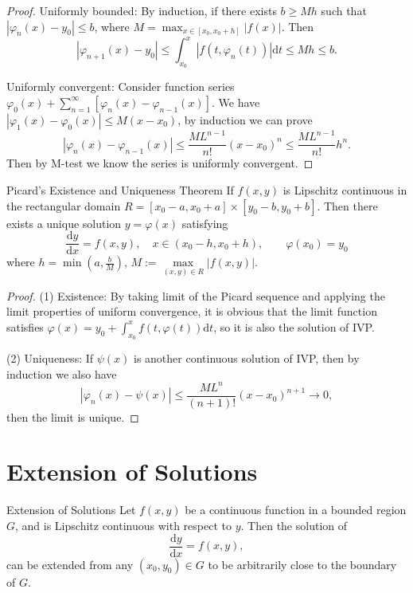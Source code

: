\begin{proof}
  Uniformly bounded: By induction, if there exists $b \geq Mh$ such that $|\varphi_n(x) - y_0| \leq b$,
  where $M = \max _{x \in [x_0, x_0 + h]}|f(x)|$. Then
  \begin{equation}
    |\varphi_{n+1}(x) - y_0| \leq \int_{x_0}^x |f(t, \varphi_n(t))|\mathrm{d} t
    \leq M h \leq b.
  \end{equation}

  Uniformly convergent: Consider function series
  $\varphi_0(x) + \sum\limits_{n = 1}^{\infty}[\varphi_n(x) - \varphi_{n-1}(x)]$.
  We have $|\varphi_1(x) - \varphi_0(x)| \leq M(x-x_0)$, by induction we can prove
  \begin{equation}
    |\varphi_n(x) - \varphi_{n-1}(x)| \leq \frac{ML^{n-1}}{n!}(x-x_0)^n \leq \frac{ML^{n-1}}{n!}h^n.
  \end{equation}
  Then by M-test we know the series is uniformly convergent.
\end{proof}


\begin{theorem}{Picard's Existence and Uniqueness Theorem}{}
  If $f(x,y)$ is Lipschitz continuous in
  the rectangular domain $R = [x_0-a,x_0+a] \times [y_0-b, y_0 + b]$.
  Then there exists a unique solution $y = \varphi(x)$ satisfying
  \begin{equation}
    \frac{\mathrm{d} y}{\mathrm{d} x} = f(x,y), \quad x\in (x_0 -h, x_0 + h),
    \quad \quad \varphi(x_0) = y_0
  \end{equation}
  where $h = \min \left( a, \frac{b}{M} \right)$, $M := \max \limits_{(x,y) \in R}|f(x,y)|$.
\end{theorem}

\begin{proof}
  (1) Existence: By taking limit of the Picard sequence
  and applying the limit properties of uniform convergence,
  it is obvious that the limit function satisfies
  $\varphi(x) = y_0 + \int_{x_0}^x f(t,\varphi(t))\mathrm{d} t$,
  so it is also the solution of IVP.

  (2) Uniqueness: If $\psi(x)$ is another continuous solution of IVP,
  then by induction we also have
  \begin{equation}
    |\varphi_n(x) - \psi(x)| \leq \frac{M L^n}{(n+1)!}(x-x_0)^{n+1} \rightarrow 0,
  \end{equation}
  then the limit is unique.
\end{proof}

\section{Extension of Solutions}

\begin{theorem}{Extension of Solutions}{}
  Let $f(x,y)$ be a continuous function in a bounded region $G$,
  and is Lipschitz continuous with respect to $y$.
  Then the solution of 
  \begin{equation}
    \frac{\mathrm{d}y}{\mathrm{d} x} = f(x,y),
  \end{equation}
  can be extended from any $(x_0, y_0) \in G$ to be arbitrarily close to the
  boundary of $G$.
\end{theorem}



